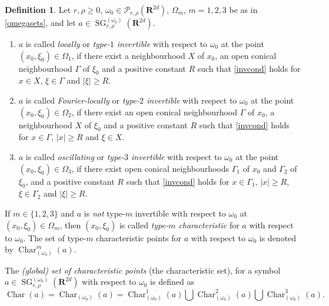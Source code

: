\documentclass[12pt,a4paper,reqno]{amsart}
\numberwithin{equation}{section}
\numberwithin{thm}{section}
\theoremstyle{definition}
\newtheorem{defn}[thm]{Definition}
\theoremstyle{remark}
\begin{document}
\par

\begin{defn}\label{defchar}
Let $r,\rho \ge 0$, $\omega _0\in \mathscr P _{r,\rho} ({\mathbf R^{{2d}}})$, $\Omega _m$, $m=1,2,3$ be as in \eqref{omegasets},
and let $a\in {\operatorname{SG}} ^{(\omega _0)}_{r,\rho}({\mathbf R^{{2d}}})$.

\medspace

\begin{enumerate}

\item $a$ is called \emph{locally} or \emph{type-$1$ invertible} 
with respect to $\omega _0$ at the
point $(x_0,\xi_0)\in \Omega _1$, if
there exist a neighbourhood $X$ of $x_0$, an open conical
neighbourhood $\Gamma$ of $\xi _0$  and a positive constant $R$
such that \eqref{invcond} holds for $x\in X$, $\xi\in \Gamma$ and
$|\xi|\ge R$.

{\vspace{0.1cm}}

\item  $a$ is called
\emph{Fourier-locally} or \emph {type-$2$ invertible} with respect to
$\omega _0$ at the point $(x_0,\xi_0)\in \Omega _2$, if
there exist an open conical neighbourhood $\Gamma$  of $x_0$, a
neighbourhood $X$ of $\xi _0$ and a positive constant $R$ such
that \eqref{invcond} holds for $x\in \Gamma$, $|x|\ge R$ and  $\xi\in
X$.

{\vspace{0.1cm}}

\item  $a$ is called
\emph{oscillating} or \emph{type-$3$ invertible} with respect to
$\omega _0$ at the point $(x_0,\xi_0)\in \Omega _3$, if
there exist open conical neighbourhoods $\Gamma _1$  of $x_0$ and
$\Gamma _2$ of $\xi _0$, and a positive constant $R$
such that \eqref{invcond} holds for $x\in \Gamma _1$, $|x|\ge R$,
$\xi \in \Gamma _2$ and $|\xi |\ge R$.

\end{enumerate}

\par

If $m\in \{ 1,2,3\}$ and  $a$ is \emph{not} type-$m$ invertible
with respect to $\omega _0$ at $(x_0,\xi_0)\in \Omega _m$,
then $(x_0,\xi_0)$ is called \emph{type-$m$ characteristic} for $a$ with
respect to $\omega _0$. The set of type-$m$
characteristic points for $a$ with respect to $\omega _0$ is denoted by
${\operatorname{Char}} _{(\omega _0)}^m(a)$.

\par

The \emph{(global) set of characteristic points} (the characteristic set), for a
symbol $a\in {\operatorname{SG}}^{(\omega _0)}_{r,\rho}({\mathbf R^{{2d}}})$ with respect to $
\omega _0$ is defined as
$$
{\operatorname{Char}} (a)={\operatorname{Char}} _{(\omega _0)}(a)={\operatorname{Char}} ^1_{(\omega
_0)}(a)\bigcup{\operatorname{Char}} ^2 _{(\omega _0)}(a)\bigcup{\operatorname{Char}} ^3_{(\omega
_0)}(a).
$$
\end{defn}
\end{document}
